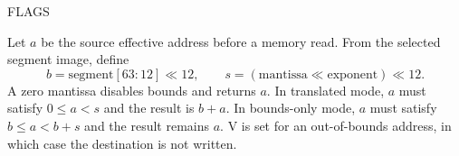 \begin{manualflageffects}{FLAGS}
\end{manualflageffects}

Let \(a\) be the source effective address before a memory read. From the selected segment image, define
\[
  b = \mathrm{segment}[63:12] \ll 12,
  \qquad s = (\mathrm{mantissa} \ll \mathrm{exponent}) \ll 12 .
\]
A zero mantissa disables bounds and returns \(a\). In translated mode, \(a\) must satisfy \(0 \le a < s\) and the result is \(b+a\). In bounds-only mode, \(a\) must satisfy \(b \le a < b+s\) and the result remains \(a\). V is set for an out-of-bounds address, in which case the destination is not written.
